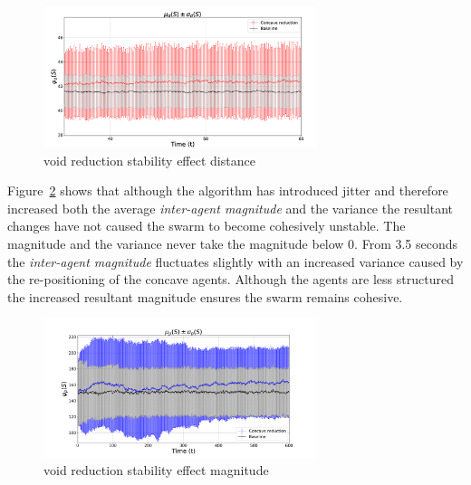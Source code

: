 \documentclass[preprint,12pt]{elsarticle}
\begin{document}
\begin{figure}
\begin{center}
\includegraphics[width=8cm]{figures/ConcavePerimeter4560-DIST-2}
\end{center}
\caption{void reduction stability effect distance\label{voids:ConcavePerimeter4560-DIST-2}}
\end{figure}
Figure~\ref{voids:ConcavePerimeter4560-MAG} shows that although the algorithm has introduced jitter and therefore increased both the average \textit{inter-agent magnitude} and the variance the resultant changes have not caused the swarm to become cohesively unstable. The magnitude and the variance never take the magnitude below 0. From 3.5 seconds the \textit{inter-agent magnitude} fluctuates slightly with an increased variance caused by the re-positioning of the concave agents. Although the agents are less structured the increased resultant magnitude ensures the swarm remains cohesive. 
\begin{figure}
\begin{center}
\includegraphics[width=8cm]{figures/ConcavePerimeter4560-MAG}
\end{center}
\caption{void reduction stability effect magnitude\label{voids:ConcavePerimeter4560-MAG}}
\end{figure}
\end{document}
